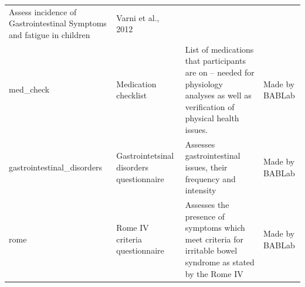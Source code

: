 \documentclass[]{book}
\begin{document}
\begin{longtable}[]{@{}llll@{}}
\begin{minipage}[t]{0.22\columnwidth}
Assess incidence of Gastrointestinal Symptoms and fatigue in children\strut
\end{minipage} & \begin{minipage}[t]{0.18\columnwidth}\raggedright
Varni et al., 2012\strut
\end{minipage}\tabularnewline
\begin{minipage}[t]{0.22\columnwidth}\raggedright
med\_check\strut
\end{minipage} & \begin{minipage}[t]{0.27\columnwidth}\raggedright
Medication checklist\strut
\end{minipage} & \begin{minipage}[t]{0.22\columnwidth}\raggedright
List of medications that participants are on -- needed for physiology analyses as well as verification of physical health issues.\strut
\end{minipage} & \begin{minipage}[t]{0.18\columnwidth}\raggedright
Made by BABLab\strut
\end{minipage}\tabularnewline
\begin{minipage}[t]{0.22\columnwidth}\raggedright
gastrointestinal\_disorders\strut
\end{minipage} & \begin{minipage}[t]{0.27\columnwidth}\raggedright
Gastrointetsinal disorders questionnaire\strut
\end{minipage} & \begin{minipage}[t]{0.22\columnwidth}\raggedright
Assesses gastrointestinal issues, their frequency and intensity\strut
\end{minipage} & \begin{minipage}[t]{0.18\columnwidth}\raggedright
Made by BABLab\strut
\end{minipage}\tabularnewline
\begin{minipage}[t]{0.22\columnwidth}\raggedright
rome\strut
\end{minipage} & \begin{minipage}[t]{0.27\columnwidth}\raggedright
Rome IV criteria questionnaire\strut
\end{minipage} & \begin{minipage}[t]{0.22\columnwidth}\raggedright
Assesses the presence of symptoms which meet criteria for irritable bowel syndrome as stated by the Rome IV\strut
\end{minipage} & \begin{minipage}[t]{0.18\columnwidth}\raggedright
Made by BABLab\strut

\end{minipage}
\end{longtable}
\end{document}
